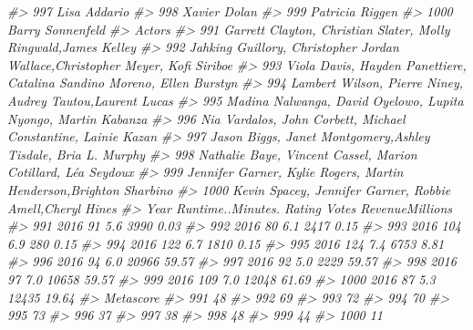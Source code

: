 \documentclass[
]{book}
\newenvironment{Shaded}{\begin{snugshade}}{\end{snugshade}}
\newcommand{\CommentTok}[1]{\textcolor[rgb]{0.56,0.35,0.01}{\textit{#1}}}
\begin{document}
\begin{Shaded}
\begin{Highlighting}[]
\CommentTok{\#\textgreater{} 997      Lisa Addario}
\CommentTok{\#\textgreater{} 998      Xavier Dolan}
\CommentTok{\#\textgreater{} 999   Patricia Riggen}
\CommentTok{\#\textgreater{} 1000 Barry Sonnenfeld}
\CommentTok{\#\textgreater{}                                                                            Actors}
\CommentTok{\#\textgreater{} 991                Garrett Clayton, Christian Slater, Molly Ringwald,James Kelley}
\CommentTok{\#\textgreater{} 992  Jahking Guillory, Christopher Jordan Wallace,Christopher Meyer, Kofi Siriboe}
\CommentTok{\#\textgreater{} 993        Viola Davis, Hayden Panettiere, Catalina Sandino Moreno, Ellen Burstyn}
\CommentTok{\#\textgreater{} 994                     Lambert Wilson, Pierre Niney, Audrey Tautou,Laurent Lucas}
\CommentTok{\#\textgreater{} 995                Madina Nalwanga, David Oyelowo, Lupita Nyong\textquotesingle{}o, Martin Kabanza}
\CommentTok{\#\textgreater{} 996                 Nia Vardalos, John Corbett, Michael Constantine, Lainie Kazan}
\CommentTok{\#\textgreater{} 997                  Jason Biggs, Janet Montgomery,Ashley Tisdale, Bria L. Murphy}
\CommentTok{\#\textgreater{} 998                  Nathalie Baye, Vincent Cassel, Marion Cotillard, Léa Seydoux}
\CommentTok{\#\textgreater{} 999             Jennifer Garner, Kylie Rogers, Martin Henderson,Brighton Sharbino}
\CommentTok{\#\textgreater{} 1000                     Kevin Spacey, Jennifer Garner, Robbie Amell,Cheryl Hines}
\CommentTok{\#\textgreater{}      Year Runtime..Minutes. Rating Votes RevenueMillions}
\CommentTok{\#\textgreater{} 991  2016                91    5.6  3990            0.03}
\CommentTok{\#\textgreater{} 992  2016                80    6.1  2417            0.15}
\CommentTok{\#\textgreater{} 993  2016               104    6.9   280            0.15}
\CommentTok{\#\textgreater{} 994  2016               122    6.7  1810            0.15}
\CommentTok{\#\textgreater{} 995  2016               124    7.4  6753            8.81}
\CommentTok{\#\textgreater{} 996  2016                94    6.0 20966           59.57}
\CommentTok{\#\textgreater{} 997  2016                92    5.0  2229           59.57}
\CommentTok{\#\textgreater{} 998  2016                97    7.0 10658           59.57}
\CommentTok{\#\textgreater{} 999  2016               109    7.0 12048           61.69}
\CommentTok{\#\textgreater{} 1000 2016                87    5.3 12435           19.64}
\CommentTok{\#\textgreater{}      Metascore}
\CommentTok{\#\textgreater{} 991         48}
\CommentTok{\#\textgreater{} 992         69}
\CommentTok{\#\textgreater{} 993         72}
\CommentTok{\#\textgreater{} 994         70}
\CommentTok{\#\textgreater{} 995         73}
\CommentTok{\#\textgreater{} 996         37}
\CommentTok{\#\textgreater{} 997         38}
\CommentTok{\#\textgreater{} 998         48}
\CommentTok{\#\textgreater{} 999         44}
\CommentTok{\#\textgreater{} 1000        11}
\end{Highlighting}
\end{Shaded}
\end{document}
